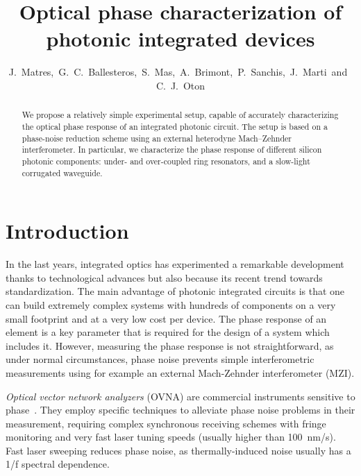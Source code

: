 \documentclass[journal]{IEEEtran}
\begin{document}
\title{Optical phase characterization of photonic integrated devices}
\author{J.~Matres,~G.~C.~Ballesteros,~S.~Mas,~A.~Brimont,~P.~Sanchis,~J.~Marti~and~C.~J.~Oton}
\maketitle

\begin{abstract}
We propose a relatively simple experimental setup, capable of accurately characterizing the optical phase response of an integrated photonic circuit.
The setup is based on a phase-noise reduction scheme using an external heterodyne Mach–Zehnder interferometer.
In particular, we characterize the phase response of different silicon photonic components: under- and over-coupled ring resonators, and a slow-light corrugated waveguide.
\end{abstract}

\section{Introduction}
\noindent In the last years, integrated optics has experimented a remarkable development thanks to technological advances but also because its recent trend towards standardization.
The main advantage of photonic integrated circuits is that one can build extremely complex systems with hundreds of components on a very small footprint and at a very low cost per device.
The phase response of an element is a key parameter that is required for the design of a system which includes it.
However, measuring the phase response is not straightforward, as under normal circumstances, phase noise prevents simple interferometric measurements using for example an external Mach-Zehnder interferometer (MZI).

\emph{Optical vector network analyzers} (OVNA) are commercial instruments sensitive to phase~\cite{Vanwiggeren2003, Gifford2005}.
They employ specific techniques to alleviate phase noise problems in their measurement, requiring complex synchronous receiving schemes with fringe monitoring and very fast laser tuning speeds (usually higher than 100~nm/s).
Fast laser sweeping reduces phase noise, as thermally-induced noise usually has a 1/f spectral dependence.
\end{document}
